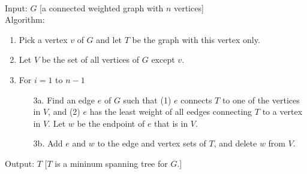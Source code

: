 \documentclass[12pt]{article}
\begin{document}
\begin{algorithm}[Prim]
\hfill\\
\normalfont Input: $G$ [a connected weighted graph with $n$ vertices]\\
Algorithm:\\
\begin{enumerate}
\item Pick a vertex $v$ of $G$ and let $T$ be the graph with this vertex only.
\item Let $V$ be the set of all vertices of $G$ except $v$.
\item For $i=1$ to $n-1$
\begin{itemize}
\item[3a.] Find an edge $e$ of $G$ such that (1) $e$ connects $T$ to one of the vertices in $V$, and (2) $e$ has the least weight of all eedges connecting $T$ to a vertex in $V$. Let $w$ be the endpoint of $e$ that is in $V$.
\item[3b.] Add $e$ and $w$ to the edge and vertex sets of $T$, and delete $w$ from $V$.
\end{itemize}
\end{enumerate}
Output: $T$ [$T$ is a mininum spanning tree for $G$.]
\end{algorithm}
\end{document}
